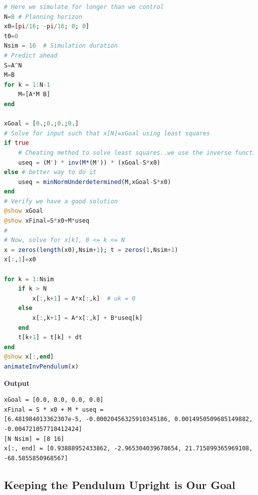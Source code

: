 \begin{lstlisting}[language=Julia,style=mystyle]
# Here we simulate for longer than we control
N=8 # Planning horizon
x0=[pi/16; -pi/16; 0; 0]
t0=0
Nsim = 16  # Simulation duration
# Predict ahead
S=A^N
M=B
for k = 1:N-1
    M=[A*M B]
end

xGoal = [0.;0.;0.;0.]
# Solve for input such that x[N]=xGoal using least squares
if true
    # Cheating method to solve least squares..we use the inverse function :( oh no....
    useq = (M') * inv(M*(M')) * (xGoal-S*x0)
else # better way to do it
    useq = minNormUnderdetermined(M,xGoal-S*x0)
end
# Verify we have a good solution
@show xGoal
@show xFinal=S*x0+M*useq
#
# Now, solve for x[k], 0 <= k <= N
x = zeros(length(x0),Nsim+1); t = zeros(1,Nsim+1)
x[:,1]=x0

for k = 1:Nsim
    if k > N
        x[:,k+1] = A*x[:,k]  # uk = 0
    else
        x[:,k+1] = A*x[:,k] + B*useq[k]
    end
    t[k+1] = t[k] + dt
end
@show x[:,end]
animateInvPendulum(x)
\end{lstlisting}
\textbf{Output} 
\begin{verbatim}
xGoal = [0.0, 0.0, 0.0, 0.0]
xFinal = S * x0 + M * useq = 
[6.481984013362307e-5, -0.00020456325910345186, 0.0014950509685149882,
-0.004721057710412424]
[N Nsim] = [8 16]
x[:, end] = [0.93888952433862, -2.965304039678654, 21.715899365969108, -68.5855850968567]
\end{verbatim}

\vspace*{.2cm}

\subsection{Keeping the Pendulum Upright is Our Goal}

